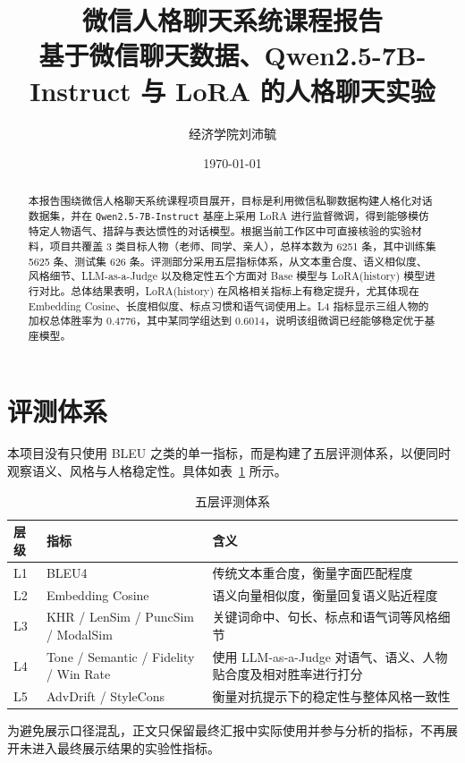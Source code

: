 \documentclass[12pt,a4paper]{ctexart}
\title{微信人格聊天系统课程报告\\\large 基于微信聊天数据、Qwen2.5-7B-Instruct 与 LoRA 的人格聊天实验}
\author{经济学院\quad 2210644\quad 刘沛毓}
\date{\today}
\begin{document}
\maketitle

\begin{abstract}
本报告围绕微信人格聊天系统课程项目展开，目标是利用微信私聊数据构建人格化对话数据集，并在 \texttt{Qwen2.5-7B-Instruct} 基座上采用 LoRA 进行监督微调，得到能够模仿特定人物语气、措辞与表达惯性的对话模型。根据当前工作区中可直接核验的实验材料，项目共覆盖 3 类目标人物（老师、同学、亲人），总样本数为 6251 条，其中训练集 5625 条、测试集 626 条。评测部分采用五层指标体系，从文本重合度、语义相似度、风格细节、LLM-as-a-Judge 以及稳定性五个方面对 Base 模型与 LoRA(history) 模型进行对比。总体结果表明，LoRA(history) 在风格相关指标上有稳定提升，尤其体现在 Embedding Cosine、长度相似度、标点习惯和语气词使用上。L4 指标显示三组人物的加权总体胜率为 0.4776，其中某同学组达到 0.6014，说明该组微调已经能够稳定优于基座模型。
\end{abstract}


\section{评测体系}

本项目没有只使用 BLEU 之类的单一指标，而是构建了五层评测体系，以便同时观察语义、风格与人格稳定性。具体如表~\ref{tab:eval-system} 所示。

\begin{table}[H]
\centering
\caption{五层评测体系}
\label{tab:eval-system}
\begin{tabular}{p{2.2cm}p{4.1cm}p{7.0cm}}
\toprule
层级 & 指标 & 含义 \\
\midrule
L1 & BLEU4 & 传统文本重合度，衡量字面匹配程度 \\
L2 & Embedding Cosine & 语义向量相似度，衡量回复语义贴近程度 \\
L3 & KHR / LenSim / PuncSim / ModalSim & 关键词命中、句长、标点和语气词等风格细节 \\
L4 & Tone / Semantic / Fidelity / Win Rate & 使用 LLM-as-a-Judge 对语气、语义、人物贴合度及相对胜率进行打分 \\
L5 & AdvDrift / StyleCons & 衡量对抗提示下的稳定性与整体风格一致性 \\
\bottomrule
\end{tabular}
\end{table}

为避免展示口径混乱，正文只保留最终汇报中实际使用并参与分析的指标，不再展开未进入最终展示结果的实验性指标。
\end{document}
